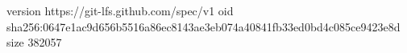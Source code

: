version https://git-lfs.github.com/spec/v1
oid sha256:0647e1ac9d656b5516a86ec8143ae3eb074a40841fb33ed0bd4c085ce9423e8d
size 382057

